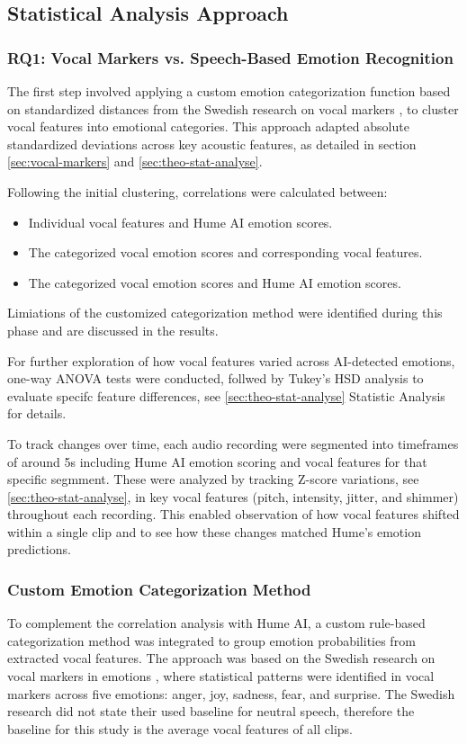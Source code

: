 \subsection{Statistical Analysis Approach}
\subsubsection{RQ1: Vocal Markers vs. Speech-Based Emotion Recognition}
The first step involved applying a custom emotion categorization function based on standardized distances from the Swedish research on vocal markers \autocite{Ekberg2023}, to cluster vocal features into emotional categories. This approach adapted 
absolute standardized deviations across key acoustic features, as detailed in section \ref{sec:vocal-markers} and \ref{sec:theo-stat-analyse}. 

Following the initial clustering, correlations were calculated between: 
\begin{itemize}
    \item Individual vocal features and Hume AI emotion scores. 
    \item The categorized vocal emotion scores and corresponding vocal features. 
    \item The categorized vocal emotion scores and Hume AI emotion scores.
\end{itemize}
Limiations of the customized categorization method were identified during this phase and are discussed in the results. 

For further exploration of how vocal features varied across AI-detected emotions, one-way ANOVA tests were conducted, follwed by Tukey's HSD analysis to evaluate specifc feature differences, see \ref{sec:theo-stat-analyse} Statistic Analysis for details.  

To track changes over time, each audio recording were segmented into timeframes of around 5s including Hume AI emotion scoring and vocal features for that specific segmment. These were analyzed by tracking Z-score variations, see \ref{sec:theo-stat-analyse}, in key vocal features (pitch, intensity, jitter, and shimmer) throughout each recording. 
This enabled observation of how vocal features shifted within a single clip and to see how these changes matched Hume's emotion predictions. 

\subsubsection{Custom Emotion Categorization Method}
To complement the correlation analysis with Hume AI, a custom rule-based categorization method was integrated to group emotion probabilities from extracted vocal features. 
The approach was based on the Swedish research on vocal markers in emotions \autocite{Ekberg2023}, where statistical patterns were identified in vocal markers across five emotions: 
anger, joy, sadness, fear, and surprise. The Swedish research did not state their used baseline for neutral speech, therefore the baseline for this study is the average vocal features of all clips. 

